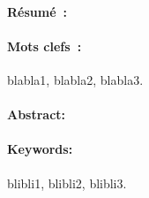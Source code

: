 \newpage
\pagestyle{empty}

\paragraph{\color{colorEPISEN-MEMOIRE}R\'esum\'e~:}
\begin{small}
\lipsum[20]

\lipsum[21]
\end{small}
\vspace*{-5mm}
\paragraph{\color{colorEPISEN-MEMOIRE}Mots clefs~:} {\small blabla1, blabla2, blabla3.}


\paragraph{\color{colorEPISEN-MEMOIRE}Abstract:}
\begin{small}

\lipsum[22]

\lipsum[23]

\end{small}
\vspace*{-5mm}
\paragraph{\color{colorEPISEN-MEMOIRE}Keywords:} {\small blibli1, blibli2, blibli3.}
